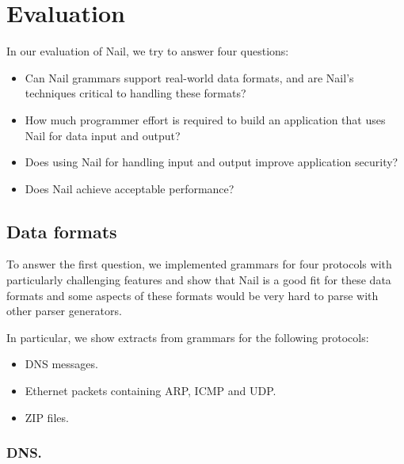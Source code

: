 \section{Evaluation}
\label{s:eval}



In our evaluation of Nail, we try to answer four questions:

\begin{itemize}

\item Can Nail grammars support real-world data formats, and
      are Nail's techniques critical to handling these formats?

\item How much programmer effort is required to build an
      application that uses Nail for data input and output?

\item Does using Nail for handling input and output improve
      application security?

\item Does Nail achieve acceptable performance?

\end{itemize}

\subsection{Data formats}
\label{s:eval-formats}
To answer the first question, we implemented grammars for four protocols with particularly
challenging features and show that Nail is a good fit for these data formats and some aspects of
these formats would be very hard to parse with other parser generators.



In particular, we show extracts from grammars for the following protocols: 
\begin{itemize}
\item DNS messages.
\item Ethernet packets containing ARP, ICMP and UDP.
\item ZIP files.

\end{itemize}

\subsubsection{DNS.}



